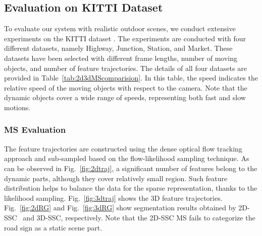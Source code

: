 \documentclass[10pt,twocolumn,letterpaper]{article}  %
\begin{document}
\begin{figure}[!h]
\begin{floatrow}
\hspace{-.8cm}
\end{floatrow}
\vspace{-3mm}
\end{figure}


\subsection{Evaluation on KITTI Dataset}
To evaluate our system with realistic outdoor scenes, we conduct extensive experiments on the KITTI dataset \cite{c32}. The experiments are conducted with four different datasets, namely Highway, Junction, Station, and Market. These datasets have been selected with different frame lengths, number of moving objects, and number of feature trajectories. The details of all four datasets are provided in Table~\ref{tab:2d3dMScomparision}. In this table, the speed indicates the relative speed of the moving objects with respect to the camera. Note that the dynamic objects cover a wide range of speeds, representing both fast and slow motions.

\subsubsection{MS Evaluation}
The feature trajectories are constructed using the dense optical flow tracking approach and sub-sampled based on the flow-likelihood sampling technique. As can be observed in Fig.~\ref{fig:2dtraj}, a significant number of features belong to the dynamic parts, although they cover relatively small region. Such feature distribution helps to balance the data for the sparse representation, thanks to the likelihood sampling. Fig.~\ref{fig:3dtraj} shows the 3D feature trajectories. Fig.~\ref{fig:2dRG} and Fig.~\ref{fig:3dRG} show segmentation results obtained by 2D-SSC~\cite{c2} and 3D-SSC, respectively. Note that the 2D-SSC MS fails to categorize the road sign as a static scene part.
\end{document}
